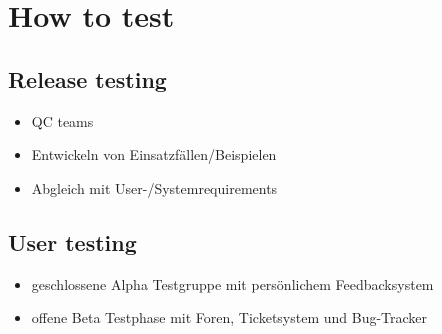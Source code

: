 \documentclass{beamer}
\begin{document}
	\section{How to test}
	\subsection{Release testing}
	\begin{frame}
		\begin{itemize}
			\item QC teams
			\item Entwickeln von Einsatzfällen/Beispielen
			\item Abgleich mit User-/Systemrequirements
		\end{itemize}
	\end{frame}
	\subsection{User testing}
	\begin{frame}
		\begin{itemize}
			\item geschlossene Alpha Testgruppe mit persönlichem Feedbacksystem
			\item offene Beta Testphase mit Foren, Ticketsystem und Bug-Tracker
		\end{itemize}
	\end{frame}
		
\end{document}
